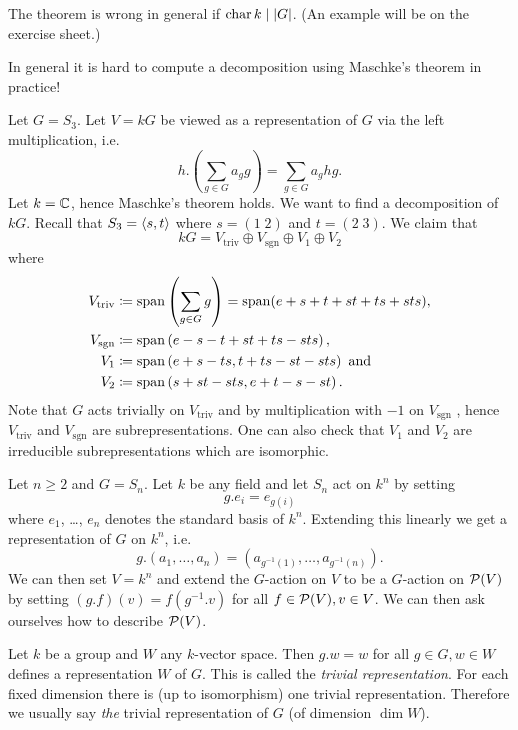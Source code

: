 \begin{warn}
 The theorem is wrong in general if $\operatorname{char} k \mid |G|$. (An example will be on the exercise sheet.)
\end{warn}

\begin{expl}
 In general it is hard to compute a decomposition using Maschke’s theorem in practice!
 
 Let $G = S_3$. Let $V = kG$ be viewed as a representation of $G$ via the left multiplication, i.e.
 \[
  h.\left(\sum_{g \in G} a_g g\right) = \sum_{g \in G} a_g hg.
 \]
 Let $k = \mathbb{C}$, hence Maschke’s theorem holds. We want to find a decomposition of $kG$. Recall that $S_3 = \left\langle s,t \right\rangle$ where $s = (1 \; 2)$ and $t = (2 \; 3)$. We claim that
 \[
  kG = V_{\text{triv}} \oplus V_{\text{sgn}} \oplus V_1 \oplus V_2
 \]
 where
 \begin{align*}
  V_{\text{triv}} &\coloneqq \operatorname{span}\left(\sum_{g \in G} g \right) = \operatorname{span}(e+s+t+st+ts+sts), \\
  V_{\text{sgn}} &\coloneqq \operatorname{span}\left(e-s-t+st+ts-sts\right), \\
  V_1 &\coloneqq \operatorname{span}\left(e+s-ts, t+ts-st-sts\right) \text{ and} \\
  V_2 &\coloneqq \operatorname{span}\left(s+st-sts,e+t-s-st\right).
 \end{align*}
 Note that $G$ acts trivially on $V_{\text{triv}}$ and by multiplication with $-1$ on $V_{\text{sgn}}$ , hence $V_{\text{triv}}$ and $V_{\text{sgn}}$ are subrepresentations. One can also check that $V_1$ and $V_2$ are irreducible subrepresentations which are isomorphic.
\end{expl}


\begin{expl}
 Let $n \geq 2$ and $G = S_n$. Let $k$ be any field and let $S_n$ act on $k^n$ by setting
 \[
  g.e_i = e_{g(i)}
 \]
 where $e_1$, \dots, $e_n$ denotes the standard basis of $k^n$. Extending this linearly we get a representation of $G$ on $k^n$, i.e.
 \[
  g.(a_1, \dotsc, a_n) = \left(a_{g^{-1}(1)}, \dotsc, a_{g^{-1}(n)}\right).
 \]
 We can then set $V = k^n$ and extend the $G$-action on $V$ to be a $G$-action on $\mathcal{P}(V)$ by setting $(g.f)(v) = f(g^{-1}.v)$ for all $f \in \mathcal{P}(V), v \in V$. We can then ask ourselves how to describe $\mathcal{P}(V)$.
\end{expl}


\begin{defi}
 Let $k$ be a group and $W$ any $k$-vector space. Then $g.w = w$ for all $g \in G, w \in W$ defines a representation $W$ of $G$. This is called the \emph{trivial representation}. For each fixed dimension there is (up to isomorphism) one trivial representation. Therefore we usually say \emph{the} trivial representation of $G$ (of dimension $\dim W$).
\end{defi}



